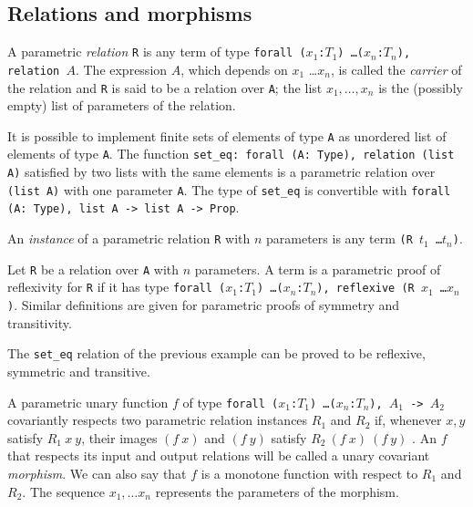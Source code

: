 
\subsection{Relations and morphisms}

A parametric \emph{relation} \texttt{R} is any term of type
\texttt{forall ($x_1$:$T_1$) \ldots ($x_n$:$T_n$), relation $A$}. The
expression $A$, which depends on $x_1$ \ldots $x_n$, is called the
\emph{carrier} of the relation and \texttt{R} is
said to be a relation over \texttt{A}; the list $x_1,\ldots,x_n$
is the (possibly empty) list of parameters of the relation.

\firstexample
\begin{cscexample}
It is possible to implement finite sets of elements of type \texttt{A}
as unordered list of elements of type \texttt{A}. The function
\texttt{set\_eq: forall (A: Type), relation (list A)} satisfied by two lists
with the same elements is a parametric relation over \texttt{(list A)} with
one parameter \texttt{A}. The type of \texttt{set\_eq} is convertible with
\texttt{forall (A: Type), list A -> list A -> Prop}.
\end{cscexample}

An \emph{instance} of a parametric relation \texttt{R} with $n$ parameters
is any term \texttt{(R $t_1$ \ldots $t_n$)}.

Let \texttt{R} be a relation over \texttt{A} with $n$ parameters.
A term is a parametric proof of reflexivity for \texttt{R} if it has type
\texttt{forall ($x_1$:$T_1$) \ldots ($x_n$:$T_n$),
 reflexive (R $x_1$ \ldots $x_n$)}. Similar definitions are given for
parametric proofs of symmetry and transitivity.

\begin{cscexample}
The \texttt{set\_eq} relation of the previous example can be proved to be
reflexive, symmetric and transitive.
\end{cscexample}

A parametric unary function $f$ of type
\texttt{forall ($x_1$:$T_1$) \ldots ($x_n$:$T_n$), $A_1$ -> $A_2$}
covariantly respects two parametric relation instances $R_1$ and $R_2$ if,
whenever $x, y$ satisfy $R_1~x~y$, their images $(f~x)$ and $(f~y)$ 
satisfy $R_2~(f~x)~(f~y)$ . An $f$ that respects its input and output relations
will be called a unary covariant \emph{morphism}. We can also say that $f$ is
a monotone function with respect to $R_1$ and $R_2$. 
The sequence $x_1,\ldots x_n$ represents the parameters of the morphism.

